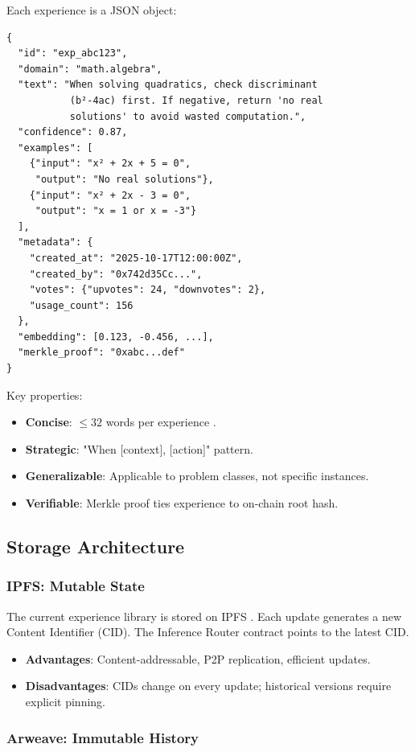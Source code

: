 \documentclass[11pt,a4paper]{article}
\begin{document}
Each experience is a JSON object:
\begin{verbatim}
{
  "id": "exp_abc123",
  "domain": "math.algebra",
  "text": "When solving quadratics, check discriminant
           (b²-4ac) first. If negative, return 'no real
           solutions' to avoid wasted computation.",
  "confidence": 0.87,
  "examples": [
    {"input": "x² + 2x + 5 = 0",
     "output": "No real solutions"},
    {"input": "x² + 2x - 3 = 0",
     "output": "x = 1 or x = -3"}
  ],
  "metadata": {
    "created_at": "2025-10-17T12:00:00Z",
    "created_by": "0x742d35Cc...",
    "votes": {"upvotes": 24, "downvotes": 2},
    "usage_count": 156
  },
  "embedding": [0.123, -0.456, ...],
  "merkle_proof": "0xabc...def"
}
\end{verbatim}

Key properties:
\begin{itemize}
\item \textbf{Concise}: $\leq 32$ words per experience \cite{tencent2025grpo}.
\item \textbf{Strategic}: "When [context], [action]" pattern.
\item \textbf{Generalizable}: Applicable to problem classes, not specific instances.
\item \textbf{Verifiable}: Merkle proof ties experience to on-chain root hash.
\end{itemize}

\subsection{Storage Architecture}

\subsubsection{IPFS: Mutable State}

The current experience library is stored on IPFS \cite{benet2014ipfs}. Each update generates a new Content Identifier (CID). The Inference Router contract points to the latest CID.

\begin{itemize}
\item \textbf{Advantages}: Content-addressable, P2P replication, efficient updates.
\item \textbf{Disadvantages}: CIDs change on every update; historical versions require explicit pinning.
\end{itemize}

\subsubsection{Arweave: Immutable History}
\end{document}
